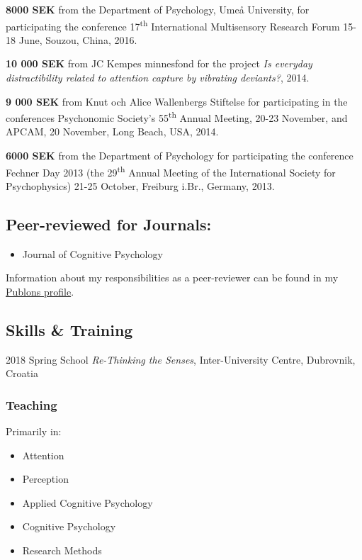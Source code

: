 \documentclass[]{article}
\providecommand{\tightlist}{%
  \setlength{\itemsep}{0pt}\setlength{\parskip}{0pt}}
\begin{document}
\textbf{8000 SEK} from the Department of Psychology, Umeå University,
for participating the conference 17\textsuperscript{th} International
Multisensory Research Forum 15-18 June, Souzou, China, 2016.

\textbf{10 000 SEK} from JC Kempes minnesfond for the project \emph{Is
everyday distractibility related to attention capture by vibrating
deviants?}, 2014.

\textbf{9 000 SEK} from Knut och Alice Wallenbergs Stiftelse for
participating in the conferences Psychonomic Society's
55\textsuperscript{th} Annual Meeting, 20-23 November, and APCAM, 20
November, Long Beach, USA, 2014.

\textbf{6000 SEK} from the Department of Psychology for participating
the conference Fechner Day 2013 (the 29\textsuperscript{th} Annual
Meeting of the International Society for Psychophysics) 21-25 October,
Freiburg i.Br., Germany, 2013.

\subsection{Peer-reviewed for
Journals:}\label{peer-reviewed-for-journals}

\begin{itemize}
\tightlist
\item
  Journal of Cognitive Psychology
\end{itemize}

Information about my responsibilities as a peer-reviewer can be found in
my \href{https://www.publons.com/a/1517052/}{Publons profile}.

\subsection{Skills \& Training}\label{skills-training}

2018 Spring School \emph{Re-Thinking the Senses}, Inter-University
Centre, Dubrovnik, Croatia

\subsubsection{Teaching}\label{teaching}

Primarily in:

\begin{itemize}
\tightlist
\item
  Attention
\item
  Perception
\item
  Applied Cognitive Psychology
\item
  Cognitive Psychology
\item
  Research Methods
\end{itemize}
\end{document}
